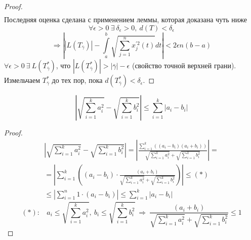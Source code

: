 \begin{proof}
\begin{multline*}
    \end{multline*}
    Последняя оценка сделана с применением леммы, которая доказана чуть ниже
    \[\forall \epsilon > 0 \ \exists\ \delta_{\epsilon} > 0,\ d(T) < \delta_{\epsilon}\]
    \[\Rightarrow \left| |L(T_{\bar{\gamma}})| - \int\limits_{a}^{b} \sqrt{\sum_{j = 1}^{n} x_{j}^{'2}(t)} dt \right| < 2 \epsilon n (b-a)\]
    $\forall \epsilon > 0 \ \exists\ L(T^{*}_{\bar{\gamma}})$, что $|L(T^{*}_{\bar{\gamma}}) | > |\bar{\gamma}| - \epsilon$ (свойство точной верхней грани). \newline
    Измельчаем $T_{\bar{\gamma}}^{*}$ до тех пор, пока $d(T_{\bar{\gamma}}^{*}) < \delta_{\epsilon}$.
\end{proof}
\begin{lemma}
    \[\left| \sqrt{\sum\limits_{i = 1}^{k} a_i^2} - \sqrt{\sum_{i = 1}^{k} b_i^2} \right| \leq \sum\limits_{i = 1}^{k} |a_i - b_i|\]
\end{lemma}
\begin{proof}
    \begin{multline*}
        \left| \sqrt{\sum\limits_{i = 1}^{k} a_i^2} - \sqrt{\sum_{i = 1}^{k} b_i^2} \right| = \left| \frac{\sum\limits_{i = 1}^{k}\left( (a_i - b_i) (a_i + b_i)\right)}{\sqrt{\sum\limits_{i = 1}^{k} a_i^2} + \sqrt{\sum\limits_{i = 1}^{k} b_i^2}} \right| =\\
        =\left| \sum\limits_{i = 1}^{k}\left( (a_i - b_i)\cdot \frac{(a_i + b_i)}{\sqrt{\sum\limits_{i = 1}^{k} a_i^2} + \sqrt{\sum\limits_{i = 1}^{k} b_i^2}}\right) \right| \leq (*)\\ 
        \leq \left| \sum\limits_{i=1}^{n} 1\cdot (a_i-b_i)\right| \leq \sum\limits_{i = 1}^{k} |a_i - b_i|
    \end{multline*}
    \[(*):\ \ \ \  a_i \leq  \sqrt{\sum\limits_{i = 1}^{k} a_i^2},\ b_i \leq \sqrt{\sum\limits_{i = 1}^{k} b_i^2}\ \Rightarrow\ \frac{(a_i + b_i)}{\sqrt{\sum\limits_{i = 1}^{k} a_i^2} + \sqrt{\sum\limits_{i = 1}^{k} b_i^2}} \leq 1\]
\end{proof} 


